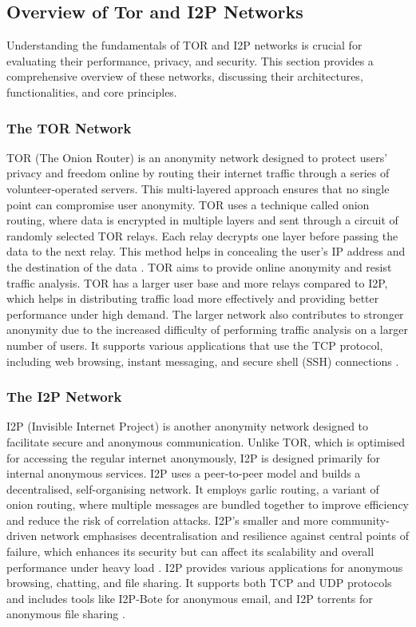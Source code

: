 \documentclass[12pt,conference]{IEEEtran}
\begin{document}
\subsection{Overview of Tor and I2P Networks}
Understanding the fundamentals of TOR and I2P networks is crucial for evaluating their performance, privacy, and security. This section provides a comprehensive overview of these networks, discussing their architectures, functionalities, and core principles.
\subsubsection{The TOR Network} 
TOR (The Onion Router) is an anonymity network designed to protect users' privacy and freedom online by routing their internet traffic through a series of volunteer-operated servers. This multi-layered approach ensures that no single point can compromise user anonymity. TOR uses a technique called onion routing, where data is encrypted in multiple layers and sent through a circuit of randomly selected TOR relays. Each relay decrypts one layer before passing the data to the next relay. This method helps in concealing the user's IP address and the destination of the data \cite{TorTheSecondGenerationOnionRouter}. TOR aims to provide online anonymity and resist traffic analysis. TOR has a larger user base and more relays compared to I2P, which helps in distributing traffic load more effectively and providing better performance under high demand. The larger network also contributes to stronger anonymity due to the increased difficulty of performing traffic analysis on a larger number of users. It supports various applications that use the TCP protocol, including web browsing, instant messaging, and secure shell (SSH) connections \cite{TorTheSecondGenerationOnionRouter}.
\subsubsection{The I2P Network}
I2P (Invisible Internet Project) is another anonymity network designed to facilitate secure and anonymous communication. Unlike TOR, which is optimised for accessing the regular internet anonymously, I2P is designed primarily for internal anonymous services. I2P uses a peer-to-peer model and builds a decentralised, self-organising network. It employs garlic routing, a variant of onion routing, where multiple messages are bundled together to improve efficiency and reduce the risk of correlation attacks. I2P's smaller and more community-driven network emphasises decentralisation and resilience against central points of failure, which enhances its security but can affect its scalability and overall performance under heavy load \cite{i2p}. I2P provides various applications for anonymous browsing, chatting, and file sharing. It supports both TCP and UDP protocols and includes tools like I2P-Bote for anonymous email, and I2P torrents for anonymous file sharing \cite{zantout02}.
\end{document}

